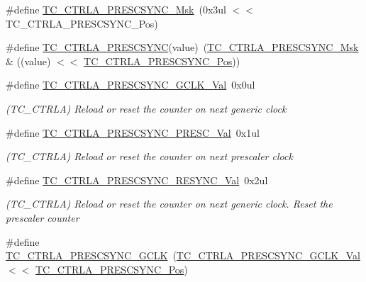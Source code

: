 \begin{DoxyCompactItemize}
\#define \mbox{\hyperlink{group___s_a_m_d21___t_c_gaa9b306e6e125ff09abc537de1182de12}{T\+C\+\_\+\+C\+T\+R\+L\+A\+\_\+\+P\+R\+E\+S\+C\+S\+Y\+N\+C\+\_\+\+Msk}}~(0x3ul $<$$<$ T\+C\+\_\+\+C\+T\+R\+L\+A\+\_\+\+P\+R\+E\+S\+C\+S\+Y\+N\+C\+\_\+\+Pos)
\item 
\#define \mbox{\hyperlink{group___s_a_m_d21___t_c_gac25421ed7d084799e2305594f9225bee}{T\+C\+\_\+\+C\+T\+R\+L\+A\+\_\+\+P\+R\+E\+S\+C\+S\+Y\+NC}}(value)~(\mbox{\hyperlink{group___s_a_m_d21___t_c_gaa9b306e6e125ff09abc537de1182de12}{T\+C\+\_\+\+C\+T\+R\+L\+A\+\_\+\+P\+R\+E\+S\+C\+S\+Y\+N\+C\+\_\+\+Msk}} \& ((value) $<$$<$ \mbox{\hyperlink{group___s_a_m_d21___t_c_ga9791c4a6d8cb12aa2b14d4fce3653c70}{T\+C\+\_\+\+C\+T\+R\+L\+A\+\_\+\+P\+R\+E\+S\+C\+S\+Y\+N\+C\+\_\+\+Pos}}))
\item 
\#define \mbox{\hyperlink{group___s_a_m_d21___t_c_gafe7113a1b787ad78681b2eafb2af17ad}{T\+C\+\_\+\+C\+T\+R\+L\+A\+\_\+\+P\+R\+E\+S\+C\+S\+Y\+N\+C\+\_\+\+G\+C\+L\+K\+\_\+\+Val}}~0x0ul
\begin{DoxyCompactList}\small\item\em (T\+C\+\_\+\+C\+T\+R\+LA) Reload or reset the counter on next generic clock \end{DoxyCompactList}\item 
\#define \mbox{\hyperlink{group___s_a_m_d21___t_c_ga624a051941bebc564f66db4b57927925}{T\+C\+\_\+\+C\+T\+R\+L\+A\+\_\+\+P\+R\+E\+S\+C\+S\+Y\+N\+C\+\_\+\+P\+R\+E\+S\+C\+\_\+\+Val}}~0x1ul
\begin{DoxyCompactList}\small\item\em (T\+C\+\_\+\+C\+T\+R\+LA) Reload or reset the counter on next prescaler clock \end{DoxyCompactList}\item 
\#define \mbox{\hyperlink{group___s_a_m_d21___t_c_ga75ae69c5919b518cf335a19768f1e4e1}{T\+C\+\_\+\+C\+T\+R\+L\+A\+\_\+\+P\+R\+E\+S\+C\+S\+Y\+N\+C\+\_\+\+R\+E\+S\+Y\+N\+C\+\_\+\+Val}}~0x2ul
\begin{DoxyCompactList}\small\item\em (T\+C\+\_\+\+C\+T\+R\+LA) Reload or reset the counter on next generic clock. Reset the prescaler counter \end{DoxyCompactList}\item 
\#define \mbox{\hyperlink{group___s_a_m_d21___t_c_ga55eefe204bcee4afbf66e34f621988e9}{T\+C\+\_\+\+C\+T\+R\+L\+A\+\_\+\+P\+R\+E\+S\+C\+S\+Y\+N\+C\+\_\+\+G\+C\+LK}}~(\mbox{\hyperlink{group___s_a_m_d21___t_c_gafe7113a1b787ad78681b2eafb2af17ad}{T\+C\+\_\+\+C\+T\+R\+L\+A\+\_\+\+P\+R\+E\+S\+C\+S\+Y\+N\+C\+\_\+\+G\+C\+L\+K\+\_\+\+Val}}   $<$$<$ \mbox{\hyperlink{group___s_a_m_d21___t_c_ga9791c4a6d8cb12aa2b14d4fce3653c70}{T\+C\+\_\+\+C\+T\+R\+L\+A\+\_\+\+P\+R\+E\+S\+C\+S\+Y\+N\+C\+\_\+\+Pos}})
$$
\end{DoxyCompactItemize}
